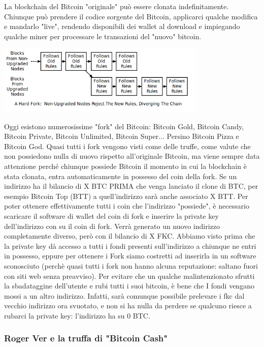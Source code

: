 \documentclass {article}
\begin{document}
La blockchain del Bitcoin "originale" può essere clonata indefinitamente. Chiunque può prendere il codice sorgente del Bitcoin, applicarci qualche modifica e mandarlo "live", rendendo disponibili dei wallet al download e impiegando qualche miner per processare le transazioni del "nuovo" bitcoin.

\includegraphics [width = 10cm] {media/hard_fork.png}

Oggi esistono numerosissime "fork" del Bitcoin: Bitcoin Gold, Bitcoin Candy, Bitcoin Private, Bitcoin Unlimited, Bitcoin Super... Persino Bitcoin Pizza e Bitcoin God.
Quasi tutti i fork vengono visti come delle truffe, come valute che non possiedono nulla di nuovo rispetto all'originale Bitcoin, ma viene sempre data attenzione perché chiunque possiede Bitcoin il momento in cui la blockchain è stata clonata, entra automaticamente in possesso del coin della fork.
Se un indirizzo ha il bilancio di X BTC PRIMA che venga lanciato il clone di BTC, per esempio Bitcoin Top (BTT) a quell'indirizzo sarà anche associato X BTT.
Per poter ottenere effettivamente tutti i coin che l'indirizzo "possiede", è necessario scaricare il software di wallet del coin di fork e inserire la private key dell'indirizzo con su il coin di fork.
Verrà generato un nuovo indirizzo completamente diverso, però con il bilancio di X FKC.
Abbiamo visto prima che la private key dà accesso a tutti i fondi presenti sull'indirizzo a chiunque ne entri in possesso, eppure per ottenere i Fork siamo costretti ad inserirla in un software sconosciuto (perchè quasi tutti i fork non hanno alcuna reputazione: saltano fuori con siti web senza preavviso).
Per evitare che un qualche malintenzionato sfrutti la sbadataggine dell'utente e rubi tutti i suoi bitcoin, è bene che I fondi vengano mossi a un altro indirizzo.
Infatti, sarà comunque possibile prelevare i fkc dal vecchio indirizzo ora svuotato, e non si ha nulla da perdere se qualcuno riesce a rubarci la private key: l'indirizzo ha su 0 BTC.


\subsubsection {Roger Ver e la truffa di "Bitcoin Cash"}
\end{document}

